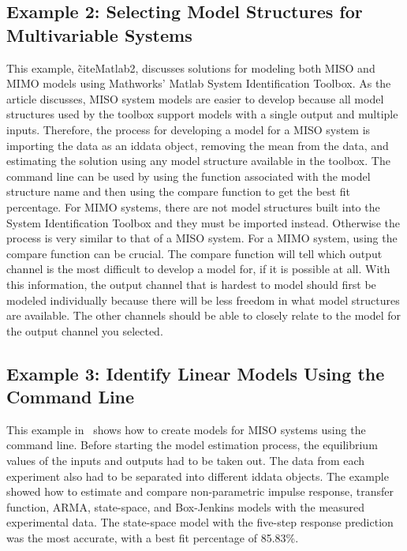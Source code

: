 \documentclass[letterpaper,12pt]{article}   %
\begin{document}
\subsection{Example 2: Selecting Model Structures for Multivariable Systems}
\label{sec:sysID-Example2}
This example, \~cite{Matlab2}, discusses solutions for modeling both MISO and MIMO models using Mathworks' Matlab System Identification Toolbox. As the article discusses, MISO system models are easier to develop because all model structures used by the toolbox support models with a single output and multiple inputs. Therefore, the process for developing a model for a MISO system is importing the data as an iddata object, removing the mean from the data, and estimating the solution using any model structure available in the toolbox. The command line can be used by using the function associated with the model structure name and then using the compare function to get the best fit percentage. For MIMO systems, there are not model structures built into the System Identification Toolbox and they must be imported instead. Otherwise the process is very similar to that of a MISO system. For a MIMO system, using the compare function can be crucial. The compare function will tell which output channel is the most difficult to develop a model for, if it is possible at all. With this information, the output channel that is hardest to model should first be modeled individually because there will be less freedom in what model structures are available. The other channels should be able to closely relate to the model for the output channel you selected.


\subsection{Example 3: Identify Linear Models Using the Command Line}
\label{sec:sysID-Example3}
This example in~\cite{example3} shows how to create models for MISO systems using the command line. Before starting the model estimation process, the equilibrium values of the inputs and outputs had to be taken out. The data from each experiment also had to be separated into different iddata objects. The example showed how to estimate and compare non-parametric impulse response, transfer function, ARMA, state-space, and Box-Jenkins models with the measured experimental data. The state-space model with the five-step response prediction was the most accurate, with a best fit percentage of 85.83\%. 
\end{document}
